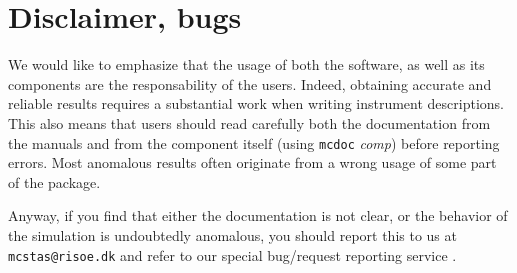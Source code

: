 \section{Disclaimer, bugs}

We would like to emphasize that the usage of both the \MCS software, as well as its components are the responsability of the users. Indeed, obtaining accurate and reliable results requires a substantial work when writing instrument descriptions. This also means that users should read carefully both the documentation from the manuals \cite{mcstasmanual} and from the component itself (using \verb+mcdoc+ \textit{comp}) before reporting errors. Most anomalous results often originate from a wrong usage of some part of the package.

Anyway, if you find that either the documentation is not clear, or the behavior of the simulation is undoubtedly anomalous, you should report this to us at \verb+mcstas@risoe.dk+ and refer to our special bug/request reporting service \cite{github_issue_webpage}.
